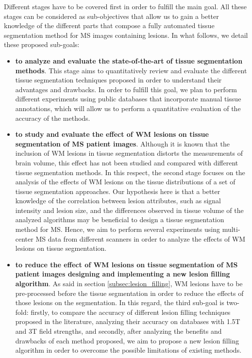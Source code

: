 \noindent Different stages have to be covered first in order to fulfill the main goal. All these stages can be considered as sub-objectives that allow us to gain a better knowledge of the different parts that compose a fully automated tissue segmentation method for MS images containing lesions. In what follows, we detail these proposed sub-goals: 

\begin{itemize}

\item \textbf{to analyze and evaluate the state-of-the-art of tissue segmentation methods}. This stage aims to quantitatively review and evaluate the different tissue segmentation techniques proposed in order to understand their advantages and drawbacks. In order to fulfill this goal, we plan to perform different experiments using public databases that incorporate manual tissue annotations, which will allow us to perform a quantitative evaluation of the accuracy of the methods. 
  
\item \textbf{to study and evaluate the effect of WM lesions on tissue segmentation of MS patient images}. Although it is known that the inclusion of WM lesions in tissue segmentation distorts the measurements of brain volume, this effect has not been studied and compared with different tissue segmentation methods. In this respect, the second stage focuses on the analysis of the effects of WM lesions on the tissue distributions of a set of tissue segmentation approaches. Our hypothesis here is that a better knowledge of the correlation between lesion attributes, such as signal intensity and lesion size, and the differences observed in tissue volume of the analyzed algorithms may be beneficial to design a tissue segmentation method for MS. Hence, we aim to perform several experiments using multi-center MS data from different scanners in order to analyze the effects of WM lesions on tissue segmentation.

\item \textbf{to reduce the effect of WM lesions on tissue segmentation of MS patient images designing and implementing a new lesion filling algorithm}. As said in section \ref{subsec:lesion_filling}, WM lesions have to be pre-processed before the tissue segmentation in order to reduce the effects of those lesions on the segmentation. In this regard, the third sub-goal is two-fold: firstly, to compare the accuracy of different lesion filling techniques proposed in the literature, analyzing their accuracy on databases with 1.5T and 3T field strengths, and secondly, after analyzing the benefits and drawbacks of each method proposed, we aim to propose a new lesion filling algorithm in order to overcome the possible limitations of existing methods.


\end{itemize}

